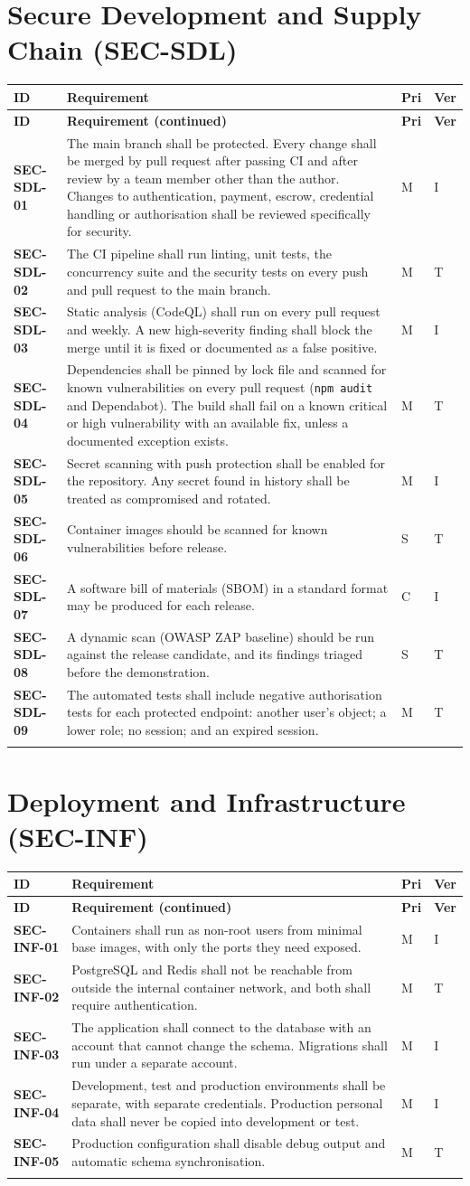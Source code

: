 \documentclass[11pt,a4paper]{report}
\makeatletter
\newenvironment{reqs}{%
  \small
  \begin{longtable}{@{}>{\raggedright\arraybackslash}p{2.35cm}
                       >{\raggedright\arraybackslash}p{10.3cm}
                       >{\centering\arraybackslash}p{0.7cm}
                       >{\centering\arraybackslash}p{0.7cm}@{}}
  \toprule
  \textbf{ID} & \textbf{Requirement} & \textbf{Pri} & \textbf{Ver} \\
  \midrule
  \endfirsthead
  \toprule
  \textbf{ID} & \textbf{Requirement (continued)} & \textbf{Pri} & \textbf{Ver} \\
  \midrule
  \endhead
  \bottomrule
  \endfoot
}{\end{longtable}}
\newcommand{\req}[5]{\leavevmode\textbf{#1}\hypertarget{#1}{} & #5 & #2 & #3 \\ \addlinespace[2pt]}
\makeatother
\begin{document}
\section{Secure Development and Supply Chain (SEC-SDL)}
\label{sec:sec-sdl}
\begin{reqs}
\req{SEC-SDL-01}{M}{I}{new}{The main branch shall be protected. Every change shall be merged by pull request after passing CI and after review by a team member other than the author. Changes to authentication, payment, escrow, credential handling or authorisation shall be reviewed specifically for security.}
\req{SEC-SDL-02}{M}{T}{NFR-16}{The CI pipeline shall run linting, unit tests, the concurrency suite and the security tests on every push and pull request to the main branch.}
\req{SEC-SDL-03}{M}{I}{new}{Static analysis (CodeQL) shall run on every pull request and weekly. A new high-severity finding shall block the merge until it is fixed or documented as a false positive.}
\req{SEC-SDL-04}{M}{T}{new}{Dependencies shall be pinned by lock file and scanned for known vulnerabilities on every pull request (\texttt{npm audit} and Dependabot). The build shall fail on a known critical or high vulnerability with an available fix, unless a documented exception exists.}
\req{SEC-SDL-05}{M}{I}{NFR-8}{Secret scanning with push protection shall be enabled for the repository. Any secret found in history shall be treated as compromised and rotated.}
\req{SEC-SDL-06}{S}{T}{new}{Container images should be scanned for known vulnerabilities before release.}
\req{SEC-SDL-07}{C}{I}{new}{A software bill of materials (SBOM) in a standard format may be produced for each release.}
\req{SEC-SDL-08}{S}{T}{new}{A dynamic scan (OWASP ZAP baseline) should be run against the release candidate, and its findings triaged before the demonstration.}
\req{SEC-SDL-09}{M}{T}{new}{The automated tests shall include negative authorisation tests for each protected endpoint: another user's object; a lower role; no session; and an expired session.}
\end{reqs}

\section{Deployment and Infrastructure (SEC-INF)}
\begin{reqs}
\req{SEC-INF-01}{M}{I}{new}{Containers shall run as non-root users from minimal base images, with only the ports they need exposed.}
\req{SEC-INF-02}{M}{T}{new}{PostgreSQL and Redis shall not be reachable from outside the internal container network, and both shall require authentication.}
\req{SEC-INF-03}{M}{I}{new}{The application shall connect to the database with an account that cannot change the schema. Migrations shall run under a separate account.}
\req{SEC-INF-04}{M}{I}{new}{Development, test and production environments shall be separate, with separate credentials. Production personal data shall never be copied into development or test.}
\req{SEC-INF-05}{M}{T}{new}{Production configuration shall disable debug output and automatic schema synchronisation.}
\end{reqs}
\end{document}

